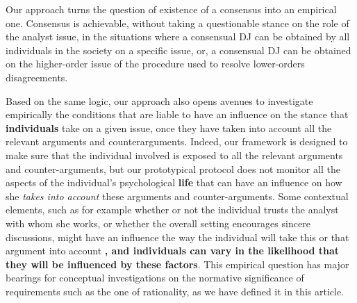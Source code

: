 \documentclass[a4paper, 11pt]{article}
\begin{document}
Our approach turns the question of existence of a consensus into an empirical one. Consensus is achievable, without taking a questionable stance on the role of the analyst issue, in the situations where a consensual \ac{DJ} can be obtained by all individuals in the society on a specific issue, or, a consensual \ac{DJ} can be obtained on the higher-order issue of the procedure used to resolve lower-orders disagreements.

Based on the same logic, our approach also opens avenues to investigate empirically the conditions that are liable to have an influence on the stance that \textbf{individuals} take on a given issue, once they have taken into account all the relevant arguments and counterarguments. Indeed, our framework is designed to make sure that the individual involved is exposed to all the relevant arguments and counter-arguments, but our prototypical protocol does not monitor all the aspects of the individual's psychological \textbf{life} that can have an influence on how she \emph{takes into account} these arguments and counter-arguments. Some contextual elements, such as for example whether or not the individual trusts the analyst with whom she works, or whether the overall setting encourages sincere discussions, might have an influence  the way the individual will take this or that argument into account \textbf{, and individuals can vary in the likelihood that they will be influenced by these factors}. %
This empirical question has major bearings for conceptual investigations on the normative significance of requirements such as the one of rationality, as we have defined it in this article. 

\end{document}

